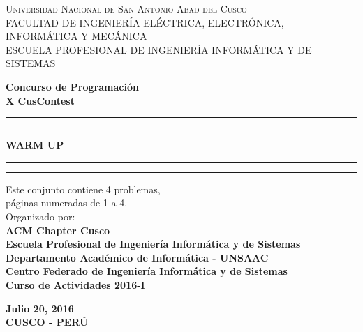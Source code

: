 \documentclass[12pt,oneside,a4paper]{book}
\theoremstyle{definition}
\begin{document}
\vspace*{1in}
\begin{center}
\textsc{\large Universidad Nacional de San Antonio Abad del Cusco}\\\vspace*{0.04in}
\textsc{FACULTAD DE INGENIERÍA ELÉCTRICA, ELECTRÓNICA, INFORMÁTICA Y MECÁNICA}\\
\vspace*{0.04in}
ESCUELA PROFESIONAL DE INGENIERÍA INFORMÁTICA Y DE SISTEMAS \\
\captionsetup[figure]{labelformat=empty}

\vspace*{2in}
\newcommand{\topline}{
\rule{164.7mm}{2mm}
\vspace*{-0.18in}
\hrule
}
\newcommand{\downline}{
\hrule
\vspace*{0.02in}
\rule{164.7mm}{2mm}
}
\vspace*{-0.6in}
\textbf{Concurso de Programación}\\
\textbf{X CusContest}\\
\vspace*{0.8in}
\topline
\vspace*{0.1in}
\begin{large}
\textbf{WARM UP} \\
\end{large}
\vspace*{0.08in}
\downline
\vspace*{0.55in}

\begin{minipage}{\linewidth}
\large
\begin{minipage}{0.45\linewidth}
\end{minipage}
\hspace{0.28\linewidth}
\begin{minipage}{0.8\linewidth}
\begin{normalsize}
Este conjunto contiene 4 problemas,\\ páginas numeradas de 1 a 4.\vspace*{0.3in}
\\Organizado por:\vspace*{-0.05in}
\\\textbf{ACM Chapter Cusco}
\\\textbf{Escuela Profesional de Ingeniería Informática y de Sistemas}
\\\textbf{Departamento Académico de Informática - UNSAAC}
\\\textbf{Centro Federado de Ingeniería Informática y de Sistemas}
\\\textbf{Curso de Actividades 2016-I}

\vspace*{1.0in}
\end{normalsize}
\end{minipage}
\end{minipage}
\vspace*{0.6in}
{
\textbf{Julio 20, 2016}\\ \vspace*{-0.6in}
\textbf{CUSCO - PERÚ}
}
\end{center}
\end{document}

